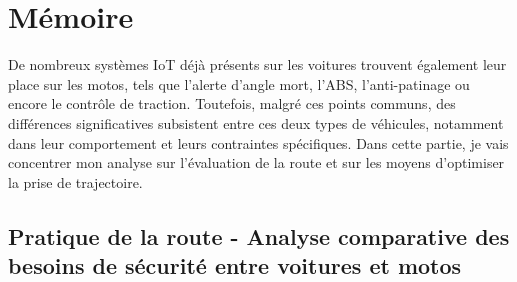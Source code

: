 \section{Mémoire}
De nombreux systèmes IoT déjà présents sur les voitures trouvent également leur place sur les motos, tels que l’alerte d’angle mort, l’ABS, l’anti-patinage ou encore le contrôle de traction. Toutefois, malgré ces points communs, des différences significatives subsistent entre ces deux types de véhicules, notamment dans leur comportement et leurs contraintes spécifiques. Dans cette partie, je vais concentrer mon analyse sur l’évaluation de la route et sur les moyens d’optimiser la prise de trajectoire.

\subsection{Pratique de la route - Analyse comparative des besoins de sécurité entre voitures et motos}


